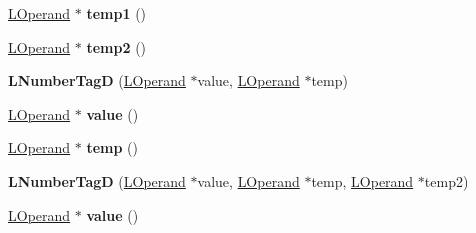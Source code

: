 \begin{DoxyCompactItemize}
\item 
\hyperlink{classv8_1_1internal_1_1_l_operand}{L\+Operand} $\ast$ {\bfseries temp1} ()\hypertarget{classv8_1_1internal_1_1_l_number_tag_d_a6fabde38ed8205821812ff7af7563151}{}\label{classv8_1_1internal_1_1_l_number_tag_d_a6fabde38ed8205821812ff7af7563151}

\item 
\hyperlink{classv8_1_1internal_1_1_l_operand}{L\+Operand} $\ast$ {\bfseries temp2} ()\hypertarget{classv8_1_1internal_1_1_l_number_tag_d_a775756f64a64d70118275571bcd4469d}{}\label{classv8_1_1internal_1_1_l_number_tag_d_a775756f64a64d70118275571bcd4469d}

\item 
{\bfseries L\+Number\+TagD} (\hyperlink{classv8_1_1internal_1_1_l_operand}{L\+Operand} $\ast$value, \hyperlink{classv8_1_1internal_1_1_l_operand}{L\+Operand} $\ast$temp)\hypertarget{classv8_1_1internal_1_1_l_number_tag_d_a8bd293a2f4e86cd47dc87c4514bafae6}{}\label{classv8_1_1internal_1_1_l_number_tag_d_a8bd293a2f4e86cd47dc87c4514bafae6}

\item 
\hyperlink{classv8_1_1internal_1_1_l_operand}{L\+Operand} $\ast$ {\bfseries value} ()\hypertarget{classv8_1_1internal_1_1_l_number_tag_d_a46629ef102a26f699165889f0cc36f88}{}\label{classv8_1_1internal_1_1_l_number_tag_d_a46629ef102a26f699165889f0cc36f88}

\item 
\hyperlink{classv8_1_1internal_1_1_l_operand}{L\+Operand} $\ast$ {\bfseries temp} ()\hypertarget{classv8_1_1internal_1_1_l_number_tag_d_a2163f8b3c4bd0dbeb6700e6dc18aef2c}{}\label{classv8_1_1internal_1_1_l_number_tag_d_a2163f8b3c4bd0dbeb6700e6dc18aef2c}

\item 
{\bfseries L\+Number\+TagD} (\hyperlink{classv8_1_1internal_1_1_l_operand}{L\+Operand} $\ast$value, \hyperlink{classv8_1_1internal_1_1_l_operand}{L\+Operand} $\ast$temp, \hyperlink{classv8_1_1internal_1_1_l_operand}{L\+Operand} $\ast$temp2)\hypertarget{classv8_1_1internal_1_1_l_number_tag_d_a67088b9bb50a700478235225d9d444e8}{}\label{classv8_1_1internal_1_1_l_number_tag_d_a67088b9bb50a700478235225d9d444e8}

\item 
\hyperlink{classv8_1_1internal_1_1_l_operand}{L\+Operand} $\ast$ {\bfseries value} ()\hypertarget{classv8_1_1internal_1_1_l_number_tag_d_a46629ef102a26f699165889f0cc36f88}{}\label{classv8_1_1internal_1_1_l_number_tag_d_a46629ef102a26f699165889f0cc36f88}


\end{DoxyCompactItemize}
